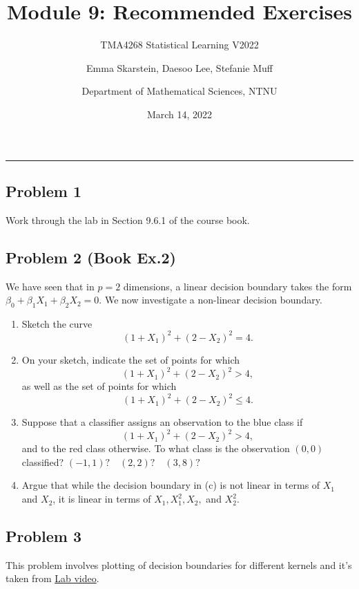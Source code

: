 \documentclass[]{article}
\title{Module 9: Recommended Exercises}
\subtitle{TMA4268 Statistical Learning V2022}
\author{Emma Skarstein, Daesoo Lee, Stefanie Muff \and Department of Mathematical Sciences, NTNU}
\date{March 14, 2022}
\begin{document}
\maketitle

\begin{center}\rule{0.5\linewidth}{0.5pt}\end{center}

\hypertarget{problem-1}{%
\subsection{Problem 1}\label{problem-1}}

Work through the lab in Section 9.6.1 of the course book.

\hypertarget{problem-2-book-ex.2}{%
\subsection{Problem 2 (Book Ex.2)}\label{problem-2-book-ex.2}}

We have seen that in \(p = 2\) dimensions, a linear decision boundary
takes the form \(\beta_0 +\beta_1 X_1 + \beta_2 X_2 = 0\). We now
investigate a non-linear decision boundary.

\begin{enumerate}
\def\labelenumi{\alph{enumi})}
\item
  Sketch the curve \[(1 + X_1)^2 + (2 - X_2)^2 = 4.\]
\item
  On your sketch, indicate the set of points for which
  \[(1+X_1)^2 +(2-X_2)^2 >4,\] as well as the set of points for which
  \[(1+X_1)^2 +(2-X_2)^2 \leq 4.\]
\item
  Suppose that a classifier assigns an observation to the blue class if
  \[(1+X_1)^2 +(2-X_2)^2 >4,\] and to the red class otherwise. To what
  class is the observation \((0, 0)\) classified?
  \((-1,1)?\quad (2,2)? \quad (3,8)?\)
\item
  Argue that while the decision boundary in (c) is not linear in terms
  of \(X_1\) and \(X_2\), it is linear in terms of \(X_1, X_1^2, X_2,\)
  and \(X_2^2.\)
\end{enumerate}

\hypertarget{problem-3}{%
\subsection{Problem 3}\label{problem-3}}

This problem involves plotting of decision boundaries for different
kernels and it's taken from
\href{https://www.youtube.com/watch?v=4KoL9vUI7xs\&list=PL5-da3qGB5IDl6MkmovVdZwyYOhpCxo5o\&index=5}{Lab
video}.
\end{document}
